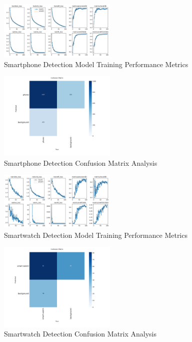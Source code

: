 \documentclass[conference]{IEEEtran}
\begin{document}
\begin{figure}[H]
\centering
\includegraphics[width=0.5\textwidth]{smartphone_model/results.png}
\caption{Smartphone Detection Model Training Performance Metrics}
\label{fig:phone_results}
\end{figure}

\begin{figure}[H]
\centering
\includegraphics[width=0.5\textwidth]{smartphone_model/confusion_matrix.png}
\caption{Smartphone Detection Confusion Matrix Analysis}
\label{fig:phone_confusion}
\end{figure}

\begin{figure}[H]
\centering
\includegraphics[width=0.5\textwidth]{smartwatch_model/results.png}
\caption{Smartwatch Detection Model Training Performance Metrics}
\label{fig:watch_results}
\end{figure}

\begin{figure}[H]
\centering
\includegraphics[width=0.5\textwidth]{smartwatch_model/confusion_matrix.png}
\caption{Smartwatch Detection Confusion Matrix Analysis}
\label{fig:watch_confusion}
\end{figure}
\end{document}
